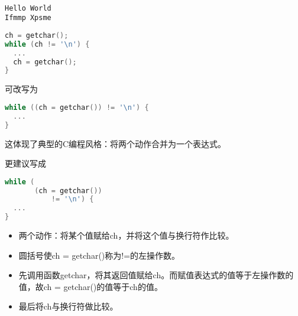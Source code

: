 \begin{frame}[fragile]
  \begin{minipage}{0.65\textwidth}
    
  \end{minipage}~~~\pause 
  \begin{minipage}{0.3\textwidth}
\begin{lstlisting}[backgroundcolor=\color{blue!20}]
Hello World
Ifmmp Xpsme
\end{lstlisting}    
  \end{minipage}

\end{frame}


\begin{frame}[fragile]
\begin{lstlisting}[language=c,frame=single]
ch = getchar();
while (ch != '\n') {
  ...
  ch = getchar();
}
\end{lstlisting} 
可改写为
\begin{lstlisting}[language=c,frame=single]
while ((ch = getchar()) != '\n') {
  ...   
}
\end{lstlisting} \pause \vspace{0.1in}

这体现了典型的C编程风格：将两个动作合并为一个表达式。
\end{frame}

\begin{frame}[fragile]
更建议写成
\begin{lstlisting}[language=c,frame=single]
while (
       (ch = getchar()) 
           != '\n') {
  ...   
}
\end{lstlisting}
\end{frame}

\begin{frame}[fragile]

\begin{itemize}
\item \tf 两个动作：将某个值赋给ch，并将这个值与换行符作比较。\\[0.1in]
\item 圆括号使ch = getchar()称为!=的左操作数。\\[0.1in]
\item 先调用函数getchar，将其返回值赋给ch。而\textcolor{acolor1}{赋值表达式的值等于左操作数的值}，故ch = getchar()的值等于ch的值。\\[0.1in]
\item 最后将ch与换行符做比较。
\end{itemize}
\end{frame}

